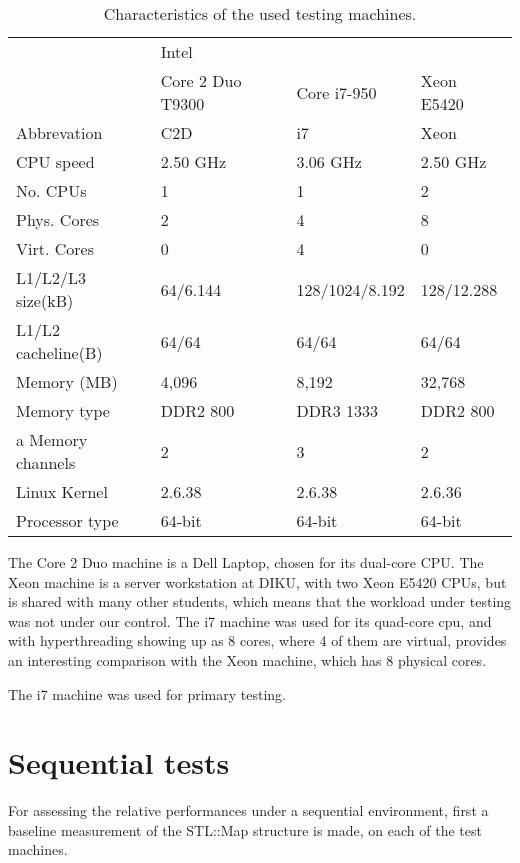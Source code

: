 \begin{table}[h!]
    \centering
    \begin{tabular}[here]{ l l l l }
        \hline
                  & Intel \\\cline{2-4}
                  & Core 2 Duo T9300 & Core i7-950  & Xeon E5420 \\ \hline
        Abbrevation & C2D & i7 & Xeon \\ 
        CPU speed   & 2.50 GHz & 3.06 GHz & 2.50 GHz \\
        No. CPUs    & 1 & 1 & 2 \\
        Phys. Cores & 2 & 4 & 8 \\
        Virt. Cores & 0 & 4 & 0 \\
        L1/L2/L3 size(kB) & 64/6.144 & 128/1024/8.192 & 128/12.288\\
        L1/L2 cacheline(B) & 64/64 & 64/64 & 64/64\\
        Memory (MB) & 4,096 & 8,192 & 32,768 \\
        Memory type & DDR2 800 & DDR3 1333 & DDR2 800 \\a
        Memory channels & 2 & 3 & 2 \\
        Linux Kernel    & 2.6.38 & 2.6.38 & 2.6.36 \\
        Processor type  & 64-bit & 64-bit & 64-bit \\\hline
    \end{tabular}
    \caption{Characteristics of the used testing machines.}
    \label{tab:cpucpecs}
\end{table}

The Core 2 Duo machine is a Dell Laptop, chosen for its dual-core CPU.
The Xeon machine is a server workstation at DIKU, with two Xeon E5420 CPUs,
but is shared with many other students, which means that the workload
under testing was not under our control. The i7 machine was used for its
quad-core cpu, and with hyperthreading showing up as 8 cores, where 4 of them
are virtual, provides an interesting comparison with the Xeon machine, which
has 8 physical cores.

The i7 machine was used for primary testing.

\section{Sequential tests}
For assessing the relative performances under a sequential environment, first a
baseline measurement of the {\keyword STL::Map} structure is made, on each of
the test machines.

